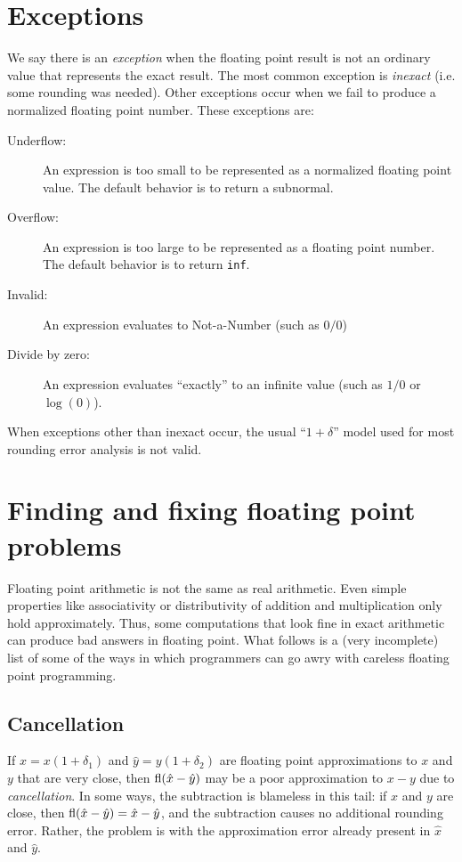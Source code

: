 \documentclass[12pt, leqno]{article}
\begin{document}
\section*{Exceptions}

We say there is an {\em exception} when the floating point result is
not an ordinary value that represents the exact result.  The most
common exception is {\em inexact} (i.e. some rounding was needed).
Other exceptions occur when we fail to produce a normalized floating
point number.  These exceptions are:
\begin{description}
\item[Underflow:]
  An expression is too small to be represented as a normalized floating
  point value.  The default behavior is to return a subnormal.
\item[Overflow:]
  An expression is too large to be represented as a floating point
  number.  The default behavior is to return {\tt inf}.
\item[Invalid:]
  An expression evaluates to Not-a-Number (such as $0/0$)
\item[Divide by zero:]
  An expression evaluates ``exactly'' to an infinite value 
  (such as $1/0$ or $\log(0)$).
\end{description}
When exceptions other than inexact occur, the usual ``$1 + \delta$''
model used for most rounding error analysis is not valid.

\section*{Finding and fixing floating point problems}

Floating point arithmetic is not the same as real arithmetic.  Even
simple properties like associativity or distributivity of addition and
multiplication only hold approximately.  Thus, some computations that
look fine in exact arithmetic can produce bad answers in floating
point.  What follows is a (very incomplete) list of some of the ways
in which programmers can go awry with careless floating point
programming.

\subsection*{Cancellation}

If $\hat{x} = x(1+\delta_1)$ and $\hat{y} = y(1+\delta_2)$ are
floating point approximations to $x$ and $y$ that are very close, then
$\operatorname{fl}(\hat{x}-\hat{y})$ may be a poor approximation to $x-y$ due to
{\em cancellation}.  In some ways, the subtraction is blameless in
this tail: if $x$ and $y$ are close, then $\operatorname{fl}(\hat{x}-\hat{y}) =
\hat{x}-\hat{y}$, and the subtraction causes no additional rounding
error.  Rather, the problem is with the approximation error already
present in $\hat{x}$ and $\hat{y}$.
\end{document}
